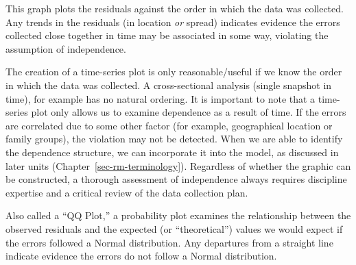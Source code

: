 \documentclass[
  letterpaper,
  DIV=11,
  numbers=noendperiod]{scrreprt}
\theoremstyle{definition}
\theoremstyle{definition}
\theoremstyle{remark}
\begin{document}
\begin{tcolorbox}[enhanced jigsaw, left=2mm, toprule=.15mm, arc=.35mm, breakable, opacitybacktitle=0.6, opacityback=0, rightrule=.15mm, colbacktitle=quarto-callout-note-color!10!white, coltitle=black, leftrule=.75mm, toptitle=1mm, colframe=quarto-callout-note-color-frame, titlerule=0mm, title=\textcolor{quarto-callout-note-color}{\faInfo}\hspace{0.5em}{Using the Time-Series Plot of the Residuals}, bottomrule=.15mm, colback=white, bottomtitle=1mm]

This graph plots the residuals against the order in which the data was
collected. Any trends in the residuals (in location \emph{or} spread)
indicates evidence the errors collected close together in time may be
associated in some way, violating the assumption of independence.

\end{tcolorbox}

The creation of a time-series plot is only reasonable/useful if we know
the order in which the data was collected. A cross-sectional analysis
(single snapshot in time), for example has no natural ordering. It is
important to note that a time-series plot only allows us to examine
dependence as a result of time. If the errors are correlated due to some
other factor (for example, geographical location or family groups), the
violation may not be detected. When we are able to identify the
dependence structure, we can incorporate it into the model, as discussed
in later units (Chapter~\ref{sec-rm-terminology}). Regardless of whether
the graphic can be constructed, a thorough assessment of independence
always requires discipline expertise and a critical review of the data
collection plan.

\begin{tcolorbox}[enhanced jigsaw, left=2mm, toprule=.15mm, arc=.35mm, breakable, opacitybacktitle=0.6, opacityback=0, rightrule=.15mm, colbacktitle=quarto-callout-note-color!10!white, coltitle=black, leftrule=.75mm, toptitle=1mm, colframe=quarto-callout-note-color-frame, titlerule=0mm, title=\textcolor{quarto-callout-note-color}{\faInfo}\hspace{0.5em}{Using the Probability Plot of the Residuals}, bottomrule=.15mm, colback=white, bottomtitle=1mm]

Also called a ``QQ Plot,'' a probability plot examines the relationship
between the observed residuals and the expected (or ``theoretical'')
values we would expect if the errors followed a Normal distribution. Any
departures from a straight line indicate evidence the errors do not
follow a Normal distribution.

\end{tcolorbox}
\end{document}
